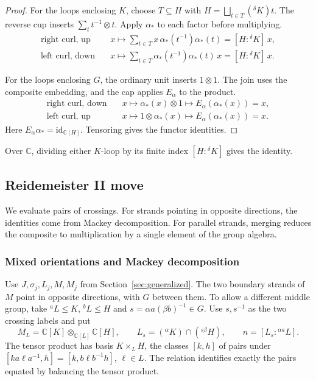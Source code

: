 \documentclass[11pt,a4paper]{article}
\numberwithin{equation}{section}
\theoremstyle{definition}
\newcommand{\C}{\mathbb C}
\newcommand{\id}{\mathrm{id}}
\newcommand{\cg}[2]{{}^{#1}\!#2}
\begin{document}
\begin{proof}
For the loops enclosing \(K\), choose \(T\subseteq H\) with
\(H=\bigsqcup_{t\in T}(\cg{\delta}{K})t\). The reverse cup inserts
\(\sum_t t^{-1}\otimes t\). Apply \(\alpha_*\) to each factor
before multiplying.
\[
\begin{aligned}
 \text{right curl, up}\quad &x\longmapsto
   \sum\nolimits_{t\in T}x\,\alpha_*(t^{-1})\alpha_*(t)
   =[H:\cg{\delta}{K}]\,x,\\
 \text{left curl, down}\quad &x\longmapsto
   \sum\nolimits_{t\in T}\alpha_*(t^{-1})\alpha_*(t)\,x
   =[H:\cg{\delta}{K}]\,x .
\end{aligned}
\]

For the loops enclosing \(G\), the ordinary unit inserts
\(1\otimes1\). The join uses the composite embedding, and the
cap applies \(E_\alpha\) to the product.
\[
\begin{aligned}
 \text{right curl, down}\quad &x\longmapsto
   \alpha_*(x)\otimes1\longmapsto E_\alpha(\alpha_*(x))=x,\\
 \text{left curl, up}\quad &x\longmapsto
   1\otimes\alpha_*(x)\longmapsto E_\alpha(\alpha_*(x))=x .
\end{aligned}
\]
Here \(E_\alpha\alpha_*=\id_{\C[H]}\). Tensoring gives the functor
identities.
\end{proof}

Over \(\C\), dividing either \(K\)-loop by its finite index
\([H:\cg{\delta}{K}]\) gives the identity.



\subsection{Reidemeister II move}\label{sec:reidemeister-two}

We evaluate pairs of crossings. For strands pointing in opposite
directions, the identities come from Mackey decomposition. For
parallel strands, merging reduces the composite to multiplication
by a single element of the group algebra.

\subsubsection{Mixed orientations and Mackey decomposition}
Use \(J,\sigma_j,L_j,M,M_j\) from Section~\ref{sec:generalized}.
The two boundary strands of \(M\) point in opposite directions,
with \(G\) between them. To allow a different middle group, take
\(\cg{a}{L}\le K\), \(\cg{b}{L}\le H\) and
\(s=\alpha a(\beta b)^{-1}\in G\). Use \(s,s^{-1}\) as the two
crossing labels and put
\[
 M_L=\C[K]\otimes_{\C[L]}\C[H],\qquad
 L_s=(\cg{\alpha}{K})\cap(\cg{s\beta}{H}),\qquad
 n=[L_s:\cg{\alpha a}{L}].
\]
The tensor product has basis \(K\times_L H\), the classes \([k,h]\)
of pairs under \([ka\ell a^{-1},h]=[k,b\ell b^{-1}h]\),
\(\ell\in L\). The relation identifies exactly the pairs equated
by balancing the tensor product.
\end{document}
